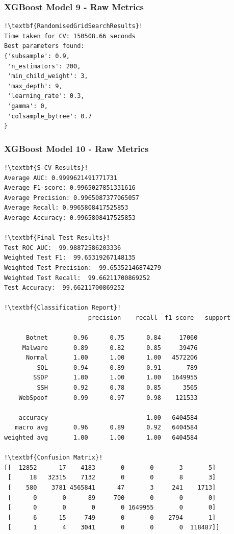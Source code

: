 \begin{appendices}
\begin{lstlisting}[escapechar=!]
\end{lstlisting}

\subsubsection{XGBoost Model 9 - Raw Metrics}
\begin{lstlisting}[escapechar=!]
!\textbf{RandomisedGridSearchResults}!
Time taken for CV: 150508.66 seconds
Best parameters found:  
{'subsample': 0.9, 
 'n_estimators': 200, 
 'min_child_weight': 3, 
 'max_depth': 9, 
 'learning_rate': 0.3, 
 'gamma': 0, 
 'colsample_bytree': 0.7
}
\end{lstlisting}

\subsubsection{XGBoost Model 10 - Raw Metrics}
\begin{lstlisting}[escapechar=!]
!\textbf{S-CV Results}!
Average AUC: 0.9999621491771731 
Average F1-score: 0.9965027851331616
Average Precision: 0.9965087377065057
Average Recall: 0.9965808417525853
Average Accuracy: 0.9965808417525853

!\textbf{Final Test Results}!
Test ROC AUC:  99.98872586203336
Weighted Test F1:  99.65319267148135
Weighted Test Precision:  99.65352146874279
Weighted Test Recall:  99.66211700869252
Test Accuracy:  99.66211700869252

!\textbf{Classification Report}!
				       precision    recall  f1-score   support

      Botnet       0.96      0.75      0.84     17060
     Malware       0.89      0.82      0.85     39476
      Normal       1.00      1.00      1.00   4572206
         SQL       0.94      0.89      0.91       789
        SSDP       1.00      1.00      1.00   1649955
         SSH       0.92      0.78      0.85      3565
    WebSpoof       0.99      0.97      0.98    121533

    accuracy                           1.00   6404584
   macro avg       0.96      0.89      0.92   6404584
weighted avg       1.00      1.00      1.00   6404584
    
!\textbf{Confusion Matrix}!    
[[  12852      17    4183       0       0       3       5]
 [     18   32315    7132       0       0       8       3]
 [    580    3781 4565841      47       3     241    1713]
 [      0       0      89     700       0       0       0]
 [      0       0       0       0 1649955       0       0]
 [      6      15     749       0       0    2794       1]
 [      1       4    3041       0       0       0  118487]]


\end{lstlisting}
\end{appendices}
